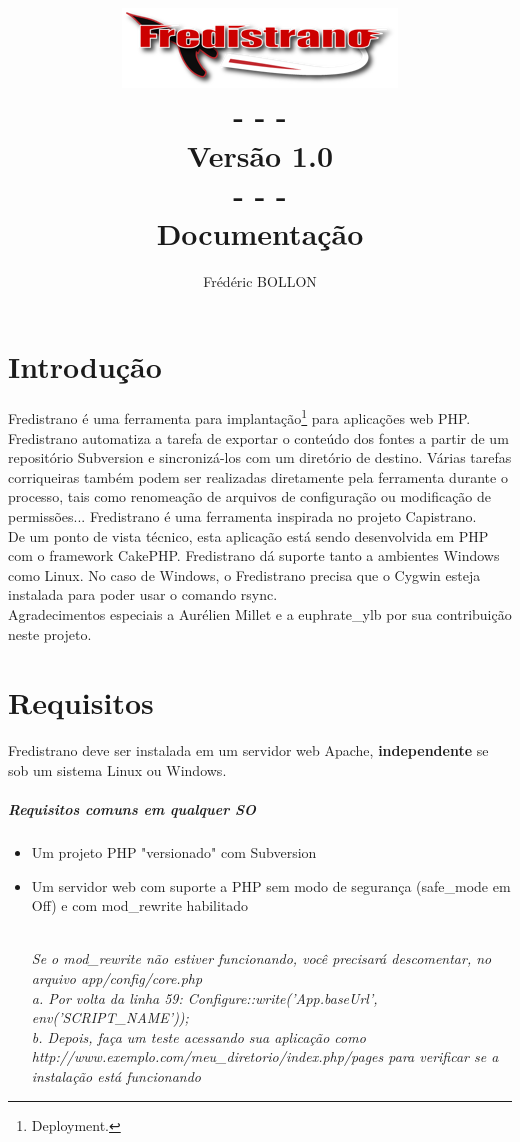 \documentclass[12pt,a4paper]{report}
\author{Frédéric BOLLON}
\title{\includegraphics{doc_fredistrano2.png}\\- - -\\Versão 1.0\\- - -\\Documentação\\}
\begin{document}
\maketitle
\tableofcontents

\chapter{Introdução}
Fredistrano é uma ferramenta para implantação\footnote{Deployment.} para aplicações web PHP.  Fredistrano automatiza a tarefa de exportar o conteúdo dos fontes a partir de um repositório Subversion e sincronizá-los com um diretório de destino.  Várias tarefas corriqueiras também podem ser realizadas diretamente pela ferramenta durante o processo, tais como renomeação de arquivos de configuração ou modificação de permissões...  Fredistrano é uma ferramenta inspirada no projeto Capistrano.\\

De um ponto de vista técnico, esta aplicação está sendo desenvolvida em PHP com o framework CakePHP.  Fredistrano dá suporte tanto a ambientes Windows como Linux.
No caso de Windows, o Fredistrano precisa que o Cygwin esteja instalada para poder usar o comando rsync.\\

Agradecimentos especiais a Aurélien Millet e a euphrate\_ylb por sua contribuição neste projeto.

\chapter{Requisitos}
Fredistrano deve ser instalada em um servidor web Apache, \textbf{independente} se sob um sistema Linux ou Windows.
\paragraph*{Requisitos comuns em qualquer SO}
\begin{itemize}
\item 
Um projeto PHP "versionado" com Subversion
\item 
Um servidor web com suporte a PHP sem modo de segurança (safe\_mode em Off) e com mod\_rewrite habilitado\\\\
\begin{small}\textit{Se o mod\_rewrite não estiver funcionando, você precisará descomentar, no arquivo app/config/core.php\\
      a. Por volta da linha 59: Configure::write('App.baseUrl', env('SCRIPT\_NAME'));\\
      b. Depois, faça um teste acessando sua aplicação como http://www.exemplo.com/meu\_diretorio/index.php/pages para verificar se a instalação está funcionando}\end{small}
\end{itemize}
\end{document}

